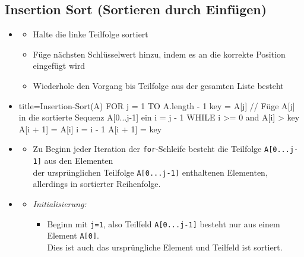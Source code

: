 \documentclass[
    12pt,
    a4paper,
    ngerman,
    color=3b,%
    marginpar=false,
    colorback=false,
    leqno,
]{tudaexercise}
\begin{document}
\subsection{Insertion Sort \textmd{(Sortieren durch Einfügen)}}\label{InsertionSort}
\begin{itemize}
    \item {}
          \begin{itemize}
              \item Halte die linke Teilfolge sortiert
              \item Füge nächsten Schlüsselwert hinzu, indem es an die korrekte Position eingefügt wird
              \item Wiederhole den Vorgang bis Teilfolge aus der gesamten Liste besteht
          \end{itemize}

    \item {}
          \begin{itemize}
              \begin{ccode}[autogobble]{title=Insertion-Sort(A)}
                  FOR j = 1 TO A.length - 1
                    key = A[j]
                    // Füge A[j] in die sortierte Sequenz A[0...j-1] ein
                    i = j - 1
                    WHILE i >= 0 and A[i] > key
                        A[i + 1] = A[i]
                        i = i - 1
                    A[i + 1] = key
              \end{ccode}
          \end{itemize}

    \item {}\label{insSortSiv}
          \begin{itemize}
              \item Zu Beginn jeder Iteration der \texttt{for}-Schleife besteht die Teilfolge \texttt{A[0...j-1]} aus den Elementen \\
                    der ursprünglichen Teilfolge \texttt{A[0...j-1]} enthaltenen Elementen, allerdings in sortierter Reihenfolge.
          \end{itemize}

    \item {}
          \begin{itemize}
              \item \textit{Initialisierung:}
                    \begin{itemize}
                        \item   Beginn mit \texttt{j=1}, also Teilfeld \texttt{A[0...j-1]} besteht nur aus einem Element \texttt{A[0]}. \\
                              Dies ist auch das ursprüngliche Element und Teilfeld ist sortiert.
                    \end{itemize}


\end{itemize}
\end{itemize}
\end{document}

